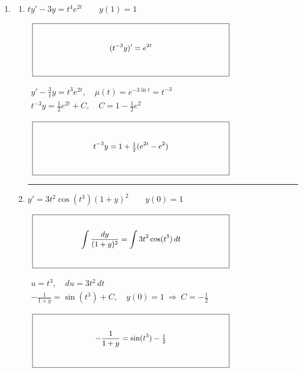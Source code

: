 \documentclass[12pt,letterpaper]{article}
\newcommand{\KeyBox}[3]{%
  \vcenter{\hbox{$\boxed{%
    \rule{0pt}{#2}\makebox[#1][c]{%
      \smash{\raisebox{\dimexpr#2/2\relax}{%
        \small\setlength{\arraycolsep}{3pt}\renewcommand{\arraystretch}{0.95}%
        $\vcenter{\hbox{$\displaystyle #3$}}$}}}}$}}}
\begin{document}
\begin{enumerate}
\begin{enumerate}
\end{enumerate}


\newpage
\item[] \mbox{}
\begin{enumerate}
\item {}\qquad $ty'-3y=t^4e^{2t}\qquad y(1)=1$
\par\noindent{}\ $\KeyBox{3.2in}{0.80in}{(t^{-3}y)'=e^{2t}}$
\par\hfill{\footnotesize $\begin{gathered}y'-\frac{3}{t}y=t^3e^{2t},\quad \mu(t)=e^{-3\ln t}=t^{-3}\\t^{-3}y=\tfrac12 e^{2t}+C,\quad C=1-\tfrac12 e^2\end{gathered}$}\par
\vfill
\noindent{}\ $\KeyBox{3.2in}{0.80in}{t^{-3}y=1+\tfrac12(e^{2t}-e^2)}$\par
\par\medskip\hrule\medskip
\item {}\qquad $y'=3t^2\cos(t^3)(1+y)^2\qquad y(0)=1$
\par\noindent{}\ $\KeyBox{3.2in}{0.80in}{\int\frac{dy}{(1+y)^2}=\int 3t^2\cos(t^3)\,dt}$
\par\hfill{\footnotesize $\begin{gathered}u=t^3,\quad du=3t^2\,dt\\-\frac{1}{1+y}=\sin(t^3)+C,\quad y(0)=1\ \Longrightarrow\ C=-\tfrac12\end{gathered}$}\par
\vfill
\noindent{}\ $\KeyBox{3.2in}{0.80in}{-\frac{1}{1+y}=\sin(t^3)-\tfrac12}$\par


\end{enumerate}
\end{enumerate}
\end{document}
